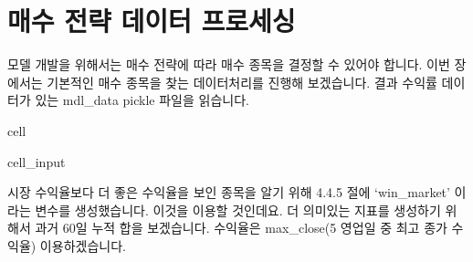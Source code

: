 \documentclass[letterpaper,10pt,english]{jupyterBook}
\begin{document}
\section{ 매수 전략 데이터 프로세싱}
\label{\detokenize{chapter4/4.4.4_Data_Processing:id2}}
\sphinxAtStartPar
모델 개발을 위해서는 매수 전략에 따라 매수 종목을 결정할 수 있어야 합니다. 이번 장에서는 기본적인 매수 종목을 찾는 데이터처리를 진행해 보겠습니다. 결과 수익률 데이터가 있는
mdl\_data pickle 파일을 읽습니다.

\begin{sphinxuseclass}{cell}\begin{sphinxVerbatimInput}

\begin{sphinxuseclass}{cell_input}
\begin{sphinxVerbatim}[commandchars=\\\{\}]
  
\end{sphinxVerbatim}

\end{sphinxuseclass}\end{sphinxVerbatimInput}

\end{sphinxuseclass}
\sphinxAtStartPar
 시장 수익율보다 더 좋은 수익율을 보인 종목을 알기 위해 4.4.5 절에 ‘win\_market’ 이라는 변수를 생성했습니다. 이것을 이용할 것인데요. 더 의미있는 지표를 생성하기 위해서 과거 60일 누적 합을 보겠습니다. 수익율은 max\_close(5 영업일 중 최고 종가 수익율) 이용하겠습니다.
\end{document}
